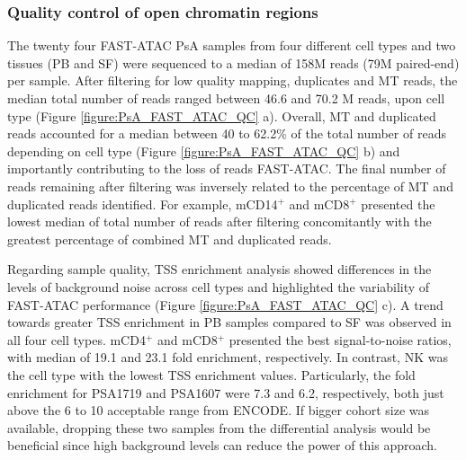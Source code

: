 \subsubsection{Quality control of open chromatin regions}
The twenty four FAST-ATAC PsA samples from four different cell types and two tissues (PB and SF) were sequenced to a median of 158M reads (79M paired-end) per sample. After filtering for low quality mapping, duplicates and MT reads, the median total number of reads ranged between 46.6 and 70.2 M reads, upon cell type (Figure \ref{figure:PsA_FAST_ATAC_QC} a).  Overall, MT and duplicated reads accounted for a median between 40 to 62.2\% of the total number of reads depending on cell type (Figure \ref{figure:PsA_FAST_ATAC_QC} b) and importantly contributing to the loss of reads FAST-ATAC. The final number of reads remaining after filtering was inversely related to the percentage of MT and duplicated reads identified. For example, mCD14$^+$ and mCD8$^+$ presented the lowest median of total number of reads after filtering concomitantly with the greatest percentage of combined MT and duplicated reads. 

Regarding sample quality, TSS enrichment analysis showed differences in the levels of background noise across cell types and highlighted the variability of FAST-ATAC performance (Figure \ref{figure:PsA_FAST_ATAC_QC} c). A trend towards greater TSS enrichment in PB samples compared to SF was observed in all four cell types. mCD4$^+$ and mCD8$^+$ presented the best signal-to-noise ratios, with median of 19.1 and 23.1 fold enrichment, respectively. In contrast, NK was the cell type with the lowest TSS enrichment values. Particularly, the fold enrichment for PSA1719 and PSA1607 were 7.3 and 6.2, respectively, both just above the 6 to 10 acceptable range from ENCODE. If bigger cohort size was available, dropping these two samples from the differential analysis would be beneficial since high background levels can reduce the power of this approach. 

